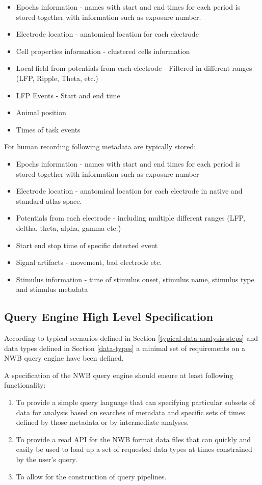 \documentclass[utf8]{frontiersSCNS} %
\begin{document}
\begin{itemize}
 \item Epochs information - names with start and end times for each period is stored together with information such as exposure number. 
 \item Electrode location - anatomical location for each electrode
 \item Cell properties information - clustered cells information
 \item Local field from potentials from each electrode - Filtered in different ranges (LFP, Ripple, Theta, etc.)
 \item LFP Events - Start and end time
 \item Animal position
 \item Times of task events
\end{itemize}

For human recording following metadata are typically stored:

\begin{itemize}
 \item Epochs information - names with start and end times for each period is stored together with information such as exposure number
 \item Electrode location - anatomical location for each electrode in native and standard atlas space.
 \item Potentials from each electrode - including multiple different ranges (LFP, deltha, theta, alpha, gamma etc.)
 \item Start end stop time of specific detected event
 \item Signal artifacts - movement, bad electrode etc.
 \item Stimulus information - time of stimulus onset, stimulus name, stimulus type and stimulus metadata
\end{itemize}



\subsection{Query Engine High Level Specification}
\label{Query_engine_specification}

According to typical scenarios defined in Section \ref{typical-data-analysis-steps} and data types defined in Section \ref{data-types} a minimal set of requirements on a NWB query engine have been defined.

A specification of the NWB query engine should ensure at least following functionality:
\begin{enumerate}
 \item To provide a simple query language that can specifying particular subsets of data for analysis based on searches of metadata and specific sets of times defined by those metadata or by intermediate analyses.
 \item To provide a read API for the NWB format data files that can quickly and easily be used to load up a set of requested data types at times constrained by the user’s query.
 \item To allow for the construction of query pipelines.
\end{enumerate}
\end{document}
